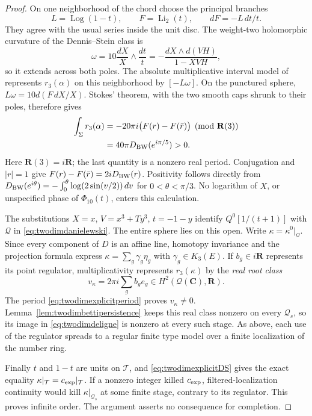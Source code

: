 \documentclass[11pt,a4paper]{article}
\theoremstyle{remark}
\newcommand{\R}{\mathbf R}
\newcommand{\C}{\mathbf C}
\begin{document}
\begin{proof}
On one neighborhood of the chord choose the principal branches
\[
 L=\operatorname{Log}(1-t),\qquad F=\operatorname{Li}_2(t),
 \qquad dF=-L\,dt/t.
\]
They agree with the usual series inside the unit disc. The
weight-two holomorphic curvature of the Dennis--Stein class is
\[
 \omega=10\frac{dX}{X}\wedge\frac{dt}{t}
       =-\frac{dX\wedge d(VH)}{1-XVH},
\]
so it extends across both poles. The absolute multiplicative
interval model of \cite[Proposition~2.8, Theorem~2.31 and
Lemma~4.5]{BunkeTamme} represents $r_3(\alpha)$ on this
neighborhood by $[-L\omega]$. On the punctured sphere,
$L\omega=10d(F\,dX/X)$. Stokes' theorem, with the two smooth
caps shrunk to their poles, therefore gives
\begin{align}
 \int_{\Sigma}r_3(\alpha)
 &=-20\pi i\bigl(F(r)-F(\bar r)\bigr)\pmod{\R(3)}
       \label{eq:twodimexplicitperiod}\\
 &=40\pi D_{\rm BW}(e^{i\pi/5})>0.\notag
\end{align}
Here $\R(3)=i\R$; the last quantity is a nonzero real period.
Conjugation and $|r|=1$ give $F(r)-F(\bar r)=2iD_{\rm BW}(r)$.
Positivity follows directly from
$D_{\rm BW}(e^{i\theta})=-\int_0^\theta
\log(2\sin(v/2))\,dv$ for $0<\theta<\pi/3$.
No logarithm of $X$, or unspecified phase of $\Phi_{10}(t)$,
enters this calculation.

The substitutions $X=x$, $V=x^3+Ty^3$, $t=-1-y$ identify
$Q^0[1/(t+1)]$ with $\mathcal Q$ in
\eqref{eq:twodimdanielewski}. The entire sphere lies on this open.
Write $\kappa=\kappa^0|_{\mathcal Q}$. Since every component of
$D$ is an affine line, homotopy invariance and the projection
formula express $\kappa=\sum_g\gamma_g\eta_g$ with
$\gamma_g\in K_3(E)$. If $b_g\in i\R$ represents its point
regulator, multiplicativity represents $r_3(\kappa)$ by the
\emph{real root class}
\[
 v_\kappa=2\pi i\sum_g b_g e_g\in H^2(\mathcal Q(\C),\R).
\]
The period \eqref{eq:twodimexplicitperiod} proves $v_\kappa\ne0$.
Lemma~\ref{lem:twodimbettipersistence} keeps this real class
nonzero on every $\mathcal Q_s$, so its image in
\eqref{eq:twodimdeligne} is nonzero at every such stage.
As above, each use of the regulator spreads to a regular finite
type model over a finite localization of the number ring.

Finally $t$ and $1-t$ are units on $\mathcal T$, and
\eqref{eq:twodimexplicitDS} gives the exact equality
$\kappa|_{\mathcal T}=c_{\rm exp}|_{\mathcal T}$.
If a nonzero integer killed $c_{\rm exp}$, filtered-localization
continuity would kill $\kappa|_{\mathcal Q_s}$ at some finite
stage, contrary to its regulator. This proves infinite order.
The argument asserts no consequence for completion.
\end{proof}
\end{document}

